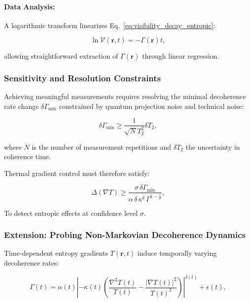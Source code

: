\documentclass[12pt]{article}
\begin{document}
\paragraph{Data Analysis:} A logarithmic transform linearizes Eq.~\eqref{eq:visibility_decay_entropic}:

\begin{equation}
\ln \mathcal{V}(\mathbf{r}, t) = - \Gamma(\mathbf{r}) t,
\label{eq:visibility_log}
\end{equation}

allowing straightforward extraction of \(\Gamma(\mathbf{r})\) through linear regression.

\subsubsection*{Sensitivity and Resolution Constraints}

Achieving meaningful measurements requires resolving the minimal decoherence rate change \(\delta \Gamma_{\text{min}}\) constrained by quantum projection noise and technical noise:

\begin{equation}
\delta \Gamma_{\text{min}} \geq \frac{1}{\sqrt{N} T_2^2} \delta T_2,
\label{eq:cramer_rao_decoherence}
\end{equation}

where \(N\) is the number of measurement repetitions and \(\delta T_2\) the uncertainty in coherence time.

Thermal gradient control must therefore satisfy:

\begin{equation}
\Delta (\nabla T) \geq \frac{\sigma \, \delta \Gamma_{\text{min}}}{\alpha \, \delta \, \kappa^\delta \, \Gamma^{1 - \frac{1}{\delta}}},
\label{eq:thermal_gradient_precision}
\end{equation}

To detect entropic effects at confidence level \(\sigma\).

\subsubsection*{Extension: Probing Non-Markovian Decoherence Dynamics}

Time-dependent entropy gradients \(T(\mathbf{r}, t)\) induce temporally varying decoherence rates:

\begin{equation}
\Gamma(t) = \alpha(t) \left| -\kappa(t) \left( \frac{\nabla^2 T(t)}{T(t)} - \frac{\left|\nabla T(t)\right|^2}{T(t)^2} \right) \right|^{\delta(t)} + \epsilon(t),
\label{eq:time_dependent_gamma}
\end{equation}
\end{document}
